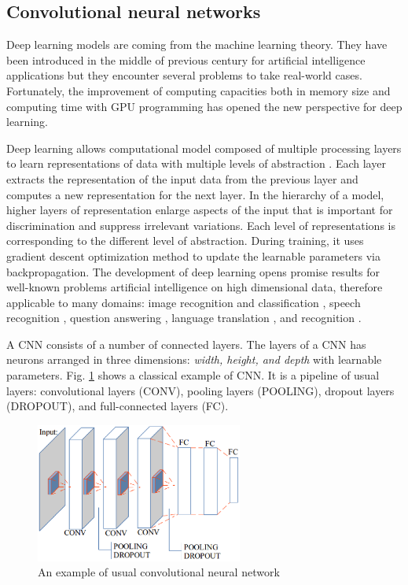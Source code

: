 \documentclass{article} %
\begin{document}
\begin{multicols}{2}
\section{Convolutional neural networks}
Deep learning models are coming from the machine learning theory. They have been introduced in the middle of previous century for artificial intelligence applications but they encounter several problems to take real-world cases. Fortunately, the improvement of computing capacities both in memory size and computing time with GPU programming has opened the new perspective for deep learning. 

Deep learning allows computational model composed of multiple processing layers to learn representations of data with multiple levels of abstraction \cite{lecun2015deep}. Each layer extracts the representation of the input data from the previous layer and computes a new representation for the next layer. In the hierarchy of a model, higher layers of representation enlarge aspects of the input that is important for discrimination and suppress irrelevant variations. Each level of representations is corresponding to the different level of abstraction. During training, it uses gradient descent optimization method to update the learnable parameters via backpropagation. The development of deep learning opens promise results for well-known problems artificial intelligence on high dimensional data, therefore applicable to many domains: image recognition and classification \cite{krizhevsky2012imagenet,ciregan2012multi,szegedy2015going}, speech recognition \cite{mikolov2011strategies,hinton2012deep,sainath2013deep}, question answering \cite{bordes2014question}, language translation \cite{sutskever2014sequence} \cite{jean2014using}, and recognition \cite{li2015convolutional}\cite{tompson2014joint}.

A CNN consists of a number of connected layers. The layers of a CNN has neurons arranged in three dimensions: \textit{width, height, and depth} with learnable parameters. Fig. \ref{figconvarc} shows a classical example of CNN. It is a pipeline of usual layers: convolutional layers (CONV), pooling layers (POOLING), dropout layers (DROPOUT), and full-connected layers (FC).

\begin{figure}[H]
	\centerline{\includegraphics[height=1.8in]{images/convarc.eps}}
	\caption{An example of usual convolutional neural network}
	\label{figconvarc}
\end{figure}


\end{multicols}
\end{document}
